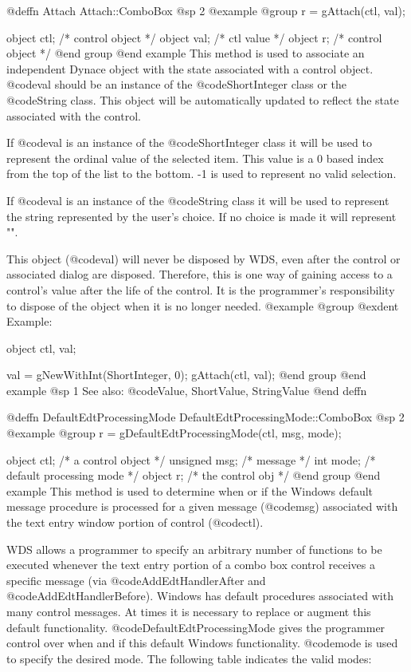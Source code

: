 {@deffn {Attach} Attach::ComboBox
@sp 2
@example
@group
r = gAttach(ctl, val);

object  ctl;   /*  control object  */
object  val;   /*  ctl value       */
object  r;     /*  control object  */
@end group
@end example
This method is used to associate an independent Dynace object with the
state associated with a control object.  @code{val} should be an
instance of the @code{ShortInteger} class or the @code{String} class.
This object will be automatically updated to reflect the state
associated with the control.

If @code{val} is an instance of the @code{ShortInteger} class it will
be used to represent the ordinal value of the selected item.  This value
is a 0 based index from the top of the list to the bottom.  -1 is used
to represent no valid selection.

If @code{val} is an instance of the @code{String} class it will be used
to represent the string represented by the user's choice.  If no choice is
made it will represent "".

This object (@code{val}) will never be disposed by WDS, even after
the control or associated dialog are disposed.  Therefore, this
is one way of gaining access to a control's value after the life
of the control.  It is the programmer's responsibility to dispose of
the object when it is no longer needed.
@example
@group
@exdent Example:

object  ctl, val;

val = gNewWithInt(ShortInteger, 0);
gAttach(ctl, val);
@end group
@end example
@sp 1
See also:  @code{Value, ShortValue, StringValue}
@end deffn












@deffn {DefaultEdtProcessingMode} DefaultEdtProcessingMode::ComboBox
@sp 2
@example
@group
r = gDefaultEdtProcessingMode(ctl, msg, mode);

object   ctl;   /*  a control object         */
unsigned msg;   /*  message                  */
int      mode;  /*  default processing mode  */
object   r;     /*  the control obj          */
@end group
@end example
This method is used to determine when or if the Windows default message
procedure is processed for a given message (@code{msg}) associated with
the text entry window portion of control (@code{ctl}).

WDS allows a programmer to specify an arbitrary number of functions to
be executed whenever the text entry portion of a combo box control
receives a specific message (via @code{AddEdtHandlerAfter} and
@code{AddEdtHandlerBefore}).  Windows has default procedures associated
with many control messages.  At times it is necessary to replace or
augment this default functionality.  @code{DefaultEdtProcessingMode}
gives the programmer control over when and if this default Windows
functionality.  @code{mode} is used to specify the desired mode.  The
following table indicates the valid modes:

}
